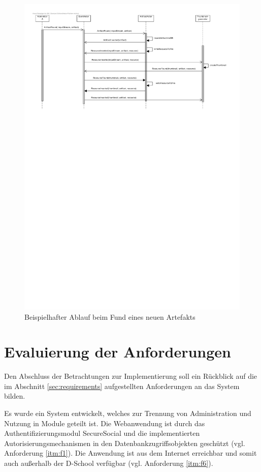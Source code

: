 \begin{figure}[h]  
  \centering     
  \includegraphics[width=1.0\textwidth]{img/eventsystem_bsp.pdf}  
   \caption{Beispielhafter Ablauf beim Fund eines neuen \gls{Artefakt}s}   
  \label{fig:eventsystem-bsp} 
\end{figure}

\section{Evaluierung der Anforderungen}

Den Abschluss der Betrachtungen zur Implementierung soll ein Rückblick auf die im Abschnitt \ref{sec:requirements} aufgestellten Anforderungen an das System bilden.

Es wurde ein System entwickelt, welches zur Trennung von Administration und Nutzung in Module geteilt ist. Die Webanwendung ist durch das Authentifizierungsmodul SecureSocial und die implementierten Autorisierungsmechanismen in den Datenbankzugriffsobjekten geschützt (vgl. Anforderung \ref{itm:f1}). Die Anwendung ist aus dem Internet erreichbar und somit auch außerhalb der D-School verfügbar (vgl. Anforderung \ref{itm:f6}).

